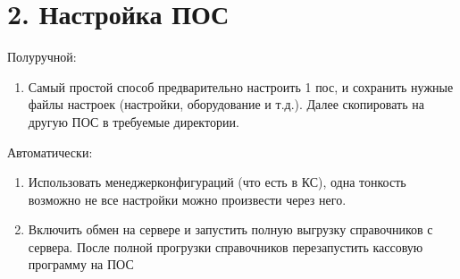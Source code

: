 \documentclass[a4paper,10pt,russian]{report}
\begin{document}
\section{2. Настройка ПОС}
\label{\detokenize{kass:id3}}
\sphinxAtStartPar
Полуручной:
\begin{enumerate}
%
\item {} 
\sphinxAtStartPar
Самый простой способ предварительно настроить 1 пос, и сохранить нужные файлы настроек (настройки, оборудование и т.д.). Далее скопировать на другую ПОС в требуемые директории.

\end{enumerate}

\sphinxAtStartPar
Автоматически:
\begin{enumerate}
%
\item {} 
\sphinxAtStartPar
Использовать менеджер\sphinxhyphen{}конфигураций (что есть в КС), одна тонкость \sphinxhyphen{} возможно не все настройки можно произвести через него.

\item {} 
\sphinxAtStartPar
Включить обмен на сервере и запустить полную выгрузку справочников с сервера. После полной прогрузки справочников \sphinxhyphen{} перезапустить кассовую программу на ПОС

\end{enumerate}

\sphinxstepscope
\end{document}
